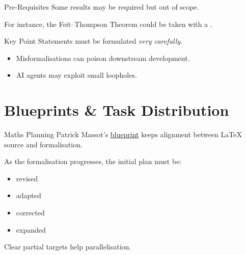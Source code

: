 \documentclass{beamer}
\newcommand{\cverb}[1]{{\color{purple}{\texttt{#1}}}}
\begin{document}
\begin{frame}{Pre-Requisites}
Some results may be required but out of scope.

\bigskip

For instance, the Feit--Thompson Theorem could be taken with a \cverb{sorry}.

\medskip

\begin{block}{Key Point}
Statements must be formulated \emph{very carefully}.
\end{block}

\begin{itemize}
  \item Misformalisations can poison downstream development.
  \medskip
  \item AI agents may exploit small loopholes.
\end{itemize}
\end{frame}

\section{Blueprints \& Task Distribution}

\begin{frame}{Maths Planning}
Patrick Massot's \href{https://github.com/PatrickMassot/leanblueprint}{blueprint} keeps alignment between LaTeX source and formalisation.

\bigskip

As the formalisation progresses, the initial plan must be:

\medskip

\begin{itemize}
  \item revised
  \smallskip
  \item adapted
  \smallskip
  \item corrected
  \smallskip
  \item expanded
\end{itemize}

\bigskip

Clear partial targets help parallelisation.
\bigskip
\begin{center}
\end{center}
\end{frame}
\end{document}
